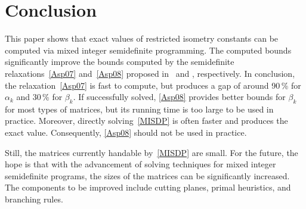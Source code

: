 \documentclass[journal]{IEEEtran}
\begin{document}


\section{Conclusion}

\noindent
This paper shows that exact values of restricted isometry constants can be
computed via mixed integer semidefinite programming. The computed bounds
significantly improve the bounds computed by the semidefinite
relaxations~\eqref{Asp07} and~\eqref{Asp08}
proposed in~\cite{Asp07} and \cite{Asp08}, respectively. In conclusion, the
relaxation~\eqref{Asp07}
is fast to compute, but produces a gap of around 90\,\% for
$\alpha_k$ and 30\,\% for $\beta_k$. If successfully solved, 
\eqref{Asp08} provides better bounds for $\beta_k$ for most types of 
matrices, but its running time is too large
to be used in practice. Moreover, directly solving~\eqref{MISDP} is often
faster and produces the exact value. Consequently, 
\eqref{Asp08} should not be used in practice.

Still, the matrices currently handable by~\eqref{MISDP} are small. For the
future, the hope is that with the advancement of solving techniques for
mixed integer semidefinite programs, the sizes of the matrices can be
significantly increased. The components to be improved include cutting
planes, primal heuristics, and branching rules.



\end{document}
